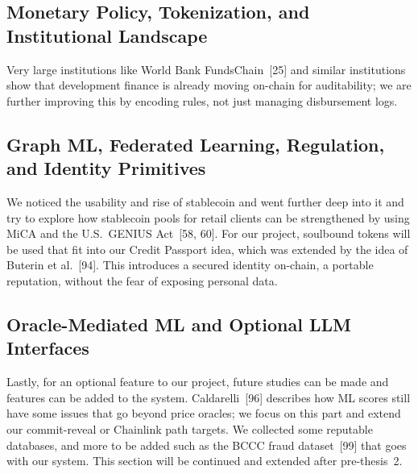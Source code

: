 \documentclass[12pt,a4paper]{report}
\begin{document}
\subsection{Monetary Policy, Tokenization, and Institutional Landscape}
\label{sec:lit-institutional}

Very large institutions like World Bank FundsChain~[25] and similar institutions show that development finance is already moving on-chain for auditability; we are further improving this by encoding rules, not just managing disbursement logs.

\subsection{Graph ML, Federated Learning, Regulation, and Identity Primitives}

We noticed the usability and rise of stablecoin and went further deep into it and try to explore how stablecoin pools for retail clients can be strengthened by using MiCA and the U.S.\ GENIUS Act~[58, 60]. For our project, soulbound tokens will be used that fit into our Credit Passport idea, which was extended by the idea of Buterin et al.~[94]. This introduces a secured identity on-chain, a portable reputation, without the fear of exposing personal data.

\subsection{Oracle-Mediated ML and Optional LLM Interfaces}
\label{sec:lit-llm}

Lastly, for an optional feature to our project, future studies can be made and features can be added to the system. Caldarelli~[96] describes how ML scores still have some issues that go beyond price oracles; we focus on this part and extend our commit-reveal or Chainlink path targets. We collected some reputable databases, and more to be added such as the BCCC fraud dataset~[99] that goes with our system. This section will be continued and extended after pre-thesis~2.
\end{document}

